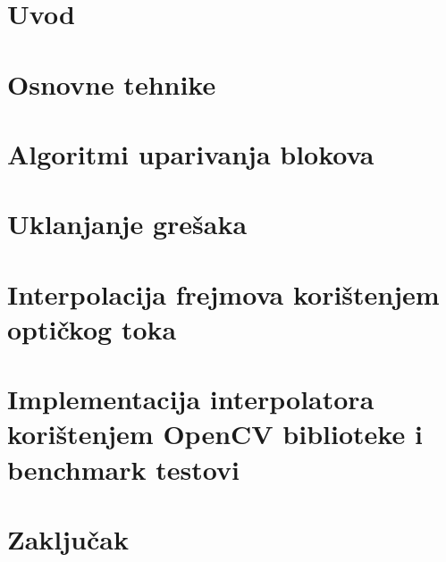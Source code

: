 \documentclass[12pt]{report}
\newcommand{\ch}{\v{c}}
\newcommand{\sh}{\v{s}}
\begin{document}
\tableofcontents

\chapter{Uvod}


\chapter{Osnovne tehnike}


\chapter{Algoritmi uparivanja blokova}


\chapter{Uklanjanje gre\sh aka}


\chapter{Interpolacija frejmova kori\sh tenjem opti\ch kog toka}


\chapter{Implementacija interpolatora kori\sh tenjem OpenCV biblioteke i benchmark testovi}

\chapter{Zaklju\ch ak}
\end{document}
